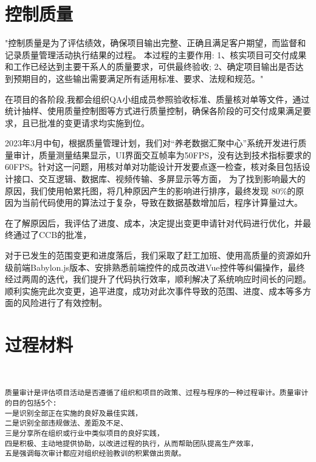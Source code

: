 \documentclass[UTF8]{../computerUniverse}
\begin{document}
\section{控制质量}

"控制质量是为了评估绩效，确保项目输出完整、正确且满足客户期望，而监督和记录质量管理活动执行结果的过程。
本过程的主要作用:
1、核实项目可交付成果和工作已经达到主要干系人的质量要求，可供最终验收;
2、确定项目输出是否达到预期目的，这些输出需要满足所有适用标准、要求、法规和规范。"



在项目的各阶段,我都会组织QA小组成员参照验收标准、质量核对单等文件，通过统计抽样、使用质量控制图等方式进行质量控制，确保各阶段的可交付成果满足要求，且已批准的变更请求均实施到位。

2023年3月中旬，根据质量管理计划，我们对“养老数据汇聚中心”系统开发进行质量审计，质量测量结果显示，UI界面交互帧率为50FPS，没有达到技术指标要求的60FPS。针对这一问题，用核对单对功能设计开发要点逐一检查，核对条目包括设计接口、交互逻辑、数据库、视频传输、多屏显示等方面，
为了找到影响最大的原因，我们使用帕累托图，将几种原因产生的影响进行排序，最终发现 80\%的原因为当前代码使用的算法过于复杂，导致在数据基数增加后，程序计算量过大。




在了解原因后，我评估了进度、成本，决定提出变更申请针对代码进行优化，并最终通过了CCB的批准，

对于已发生的范围变更和进度落后，我们采取了赶工加班、使用高质量的资源如升级前端Babylon.js版本、安排熟悉前端控件的成员改进Vue控件等纠偏操作，最终经过两周的迭代，我们提升了代码执行效率，顺利解决了系统响应时间长的问题。顺利实施完此次变更，追平进度，成功对此次事件导致的范围、进度、成本等多方面的风险进行了有效控制。






\section{过程材料}
\begin{lstlisting}
 

质量审计是评估项目活动是否遵循了组织和项目的政策、过程与程序的一种过程审计。质量审计的目的包括5个:
一是识别全部正在实施的良好及最佳实践，
二是识别全部违规做法、差距及不足、
三是分享所在组织或行业中类似项目的良好实践，
四是积极、主动地提供协助，以改进过程的执行，从而帮助团队提高生产效率，
五是强调每次审计都应对组织经验教训的积累做出贡献。

\end{lstlisting}
\end{document}
